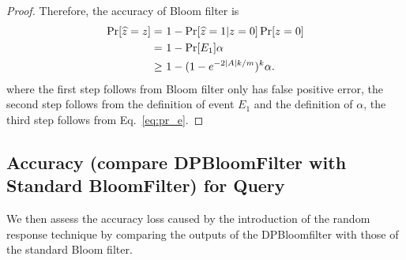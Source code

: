 \begin{proof}
Therefore, the accuracy of Bloom filter is
\begin{align*}
    \Pr[\widehat{z} = z] 
    = & ~ 1 - \Pr[\widehat{z} = 1 | z = 0] \Pr[z=0] \\
    = & ~ 1 - \Pr[E_1] \alpha \\
    \geq & ~ 1 - (1 - e^{-2 |A| k / m})^k \alpha.
\end{align*}
where the first step follows from Bloom filter only has false positive error, the second step follows from the definition of event $E_1$ and the definition of $\alpha$, the third step follows from Eq.~\eqref{eq:pr_e}. 

\end{proof}

\subsection{Accuracy (compare DPBloomFilter with Standard BloomFilter) for Query}\label{sec:acc_dpbloom_bloom}
We then assess the accuracy loss caused by the introduction of the random response technique by comparing the outputs of the DPBloomfilter with those of the standard Bloom filter.

